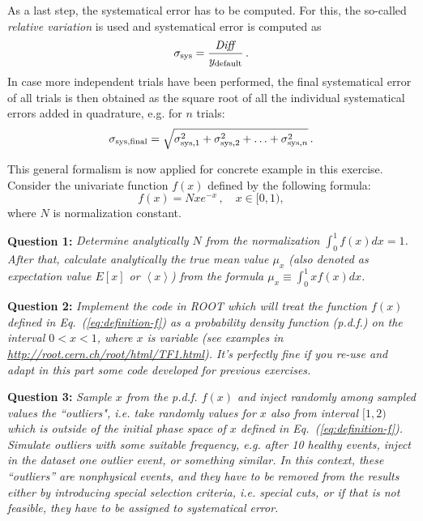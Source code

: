 \documentclass[11pt]{article}
\begin{document}
As a last step, the systematical error has to be computed. For this, the so-called \textit{relative variation} is used and systematical error is computed as 
%
\begin{equation} 
	\sigma_{\rm sys} = \frac{\mathit{Diff}}{y_{\rm default}}\,.
\end{equation}
%
In case more independent trials have been performed, the final systematical error of all trials is then obtained as the square root of all the individual systematical errors added in quadrature, e.g. for $n$ trials:
%
\begin{equation}
	\sigma_{\rm sys, final} = \sqrt{ \sigma_{\rm sys, 1}^2 + \sigma_{\rm sys, 2}^2 + \ldots + \sigma_{{\rm sys,} n}^2}\,.
\end{equation}
% 

\bigskip


\noindent This general formalism is now applied for concrete example in this exercise. Consider the univariate function $f(x)$ defined by the following formula:
% 
\begin{equation}
	f(x) = Nxe^{-x}\,,\quad x\in [0,1),
	\label{eq:definition-f}
\end{equation}
%
where $N$ is normalization constant.

\bigskip

\noindent\textbf{Question 1:} {\it Determine analytically $N$ from the normalization $\int_0^1 f(x)dx = 1$. After that, calculate analytically the true mean value $\mu_x$ (also denoted as expectation value $E[x]$ or $\left<x\right>$) from the formula $\mu_x \equiv \int_0^1 x f(x) dx$.}

\bigskip

\noindent\textbf{Question 2:} {\it Implement the code in ROOT which will treat the function $f(x)$ defined in Eq.~(\ref{eq:definition-f}) as a probability density function (p.d.f.) on the interval $0 < x < 1$, where $x$ is variable (see examples in \url{http://root.cern.ch/root/html/TF1.html}). It's perfectly fine if you re-use and adapt in this part some code developed for previous exercises.} 

\bigskip

\noindent\textbf{Question 3:} {\it Sample $x$ from the p.d.f. $f(x)$ and inject randomly among sampled values the ``outliers", i.e. take randomly values for $x$ also from interval $[1,2)$ which is outside of the initial phase space of $x$ defined in Eq.~(\ref{eq:definition-f}). Simulate outliers with some suitable frequency, e.g. after 10 healthy events, inject in the dataset one outlier event, or something similar. In this context, these ``outliers'' are nonphysical events, and they have to be removed from the results either by introducing special selection criteria, i.e. special cuts, or if that is not feasible, they have to be assigned to systematical error.}
\end{document}
